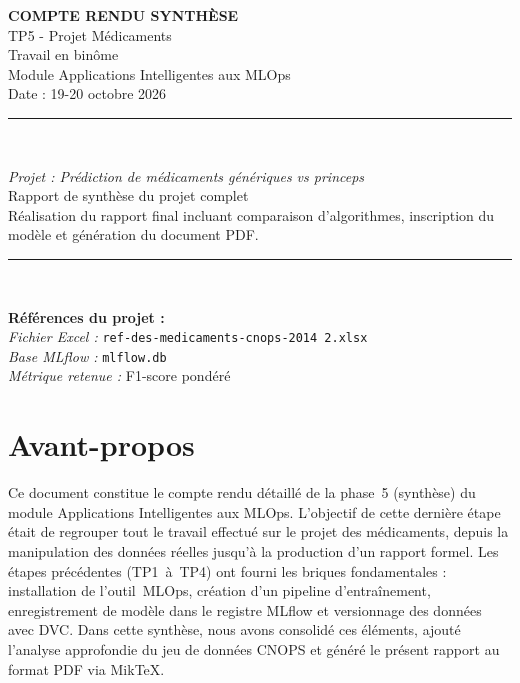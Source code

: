 \documentclass[12pt,a4paper]{report}
\begin{document}
\begin{titlepage}
\begin{center}
    \vspace{2cm}
    
    {\LARGE \bfseries COMPTE RENDU SYNTHÈSE \\}
    \vspace{0.5cm}
    {\large TP5 - Projet Médicaments}\\[2cm]
    
    {\large Travail en binôme \\}
    {\large Module Applications Intelligentes aux MLOps}\\[0.5cm]
    {\large Date : 19-20 octobre 2026}\\[2cm]
    {\rule{0.8\textwidth}{1.5pt}\\[0.5cm]}
    {\large \textit{Projet : Prédiction de médicaments génériques vs princeps}}\\[2cm]
    {\large Rapport de synthèse du projet complet}\\[2cm]
    
    \vfill
    {\large Réalisation du rapport final incluant comparaison d'algorithmes, inscription du modèle et génération du document PDF.}
    
    \vspace{1cm}
    {\rule{0.8\textwidth}{0.5pt}\\[1cm]}
    {\large \textbf{Références du projet :}\\
    \textit{Fichier Excel :} \texttt{ref-des-medicaments-cnops-2014 2.xlsx}\\
    \textit{Base MLflow :} \texttt{mlflow.db}\\
    \textit{Métrique retenue :} F1-score pondéré}
    
\end{center}
\end{titlepage}

\chapter*{Avant-propos}
Ce document constitue le compte rendu détaillé de la phase~5 (synthèse) du module Applications Intelligentes aux MLOps. L'objectif de cette dernière étape était de regrouper tout le travail effectué sur le projet des médicaments, depuis la manipulation des données réelles jusqu'à la production d'un rapport formel. Les étapes précédentes (TP1~à~TP4) ont fourni les briques fondamentales : installation de l'outil~MLOps, création d'un pipeline d'entraînement, enregistrement de modèle dans le registre MLflow et versionnage des données avec DVC. Dans cette synthèse, nous avons consolidé ces éléments, ajouté l'analyse approfondie du jeu de données CNOPS et généré le présent rapport au format PDF via MikTeX.
\end{document}
